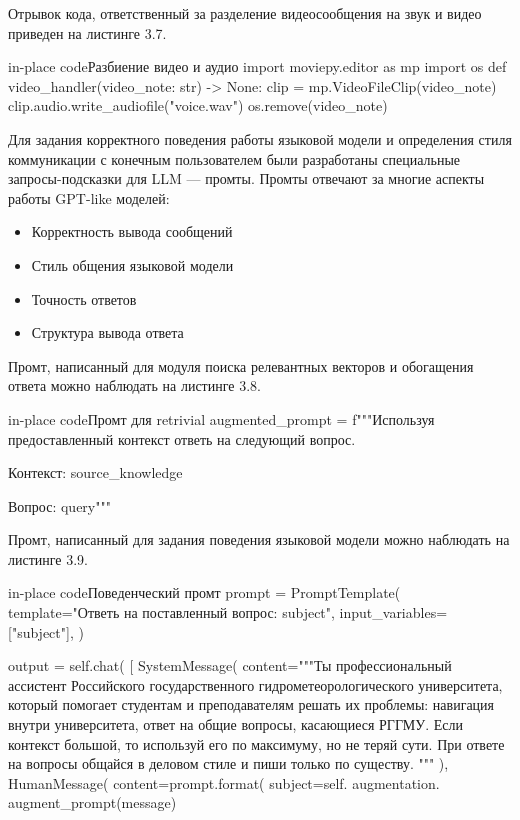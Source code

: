 
Отрывок кода, ответственный за разделение видеосообщения на звук и видео
приведен на листинге 3.7.

\begin{codepiece}{in-place code}{Разбиение видео и аудио}
    import moviepy.editor as mp
import os
def video_handler(video_note: str) -> None:
    clip = mp.VideoFileClip(video_note)
    clip.audio.write_audiofile("voice.wav")
    os.remove(video_note)
\end{codepiece}


Для задания корректного поведения работы языковой модели и определения стиля
коммуникации с конечным пользователем были разработаны специальные
запросы-подсказки для LLM --- промты. Промты отвечают за многие аспекты работы
GPT-like моделей: 

\begin{itemize}
    \item Корректность вывода сообщений
    \item Стиль общения языковой модели
    \item Точность ответов
    \item Структура вывода ответа
\end{itemize}

Промт, написанный для модуля поиска релевантных векторов и обогащения ответа
можно наблюдать на листинге 3.8.

\begin{codepiece}{in-place code}{Промт для retrivial}
        augmented_prompt = f"""Используя предоставленный контекст ответь на следующий вопрос.

        Контекст:
        {source_knowledge}

        Вопрос: {query}"""
\end{codepiece}

Промт, написанный для задания поведения языковой модели можно наблюдать на 
листинге 3.9.

\begin{codepiece}{in-place code}{Поведенческий промт}
        prompt = PromptTemplate(
            template="Ответь на поставленный вопрос: {subject}",
            input_variables=["subject"],
        )

        output = self.chat(
            [
                SystemMessage(
                    content="""Ты профессиональный ассистент Российского
                    государственного гидрометеорологического университета,
                    который помогает студентам и преподавателям решать их
                    проблемы: навигация внутри университета, ответ на общие
                    вопросы, касающиеся РГГМУ. Если контекст большой, то
                    используй его по максимуму, но не теряй сути.
                    При ответе на вопросы общайся в деловом стиле и пиши
                    только по существу. """
                ),
                HumanMessage(
                    content=prompt.format(
                        subject=self.
                        augmentation.
                        augment_prompt(message)
\end{codepiece}

